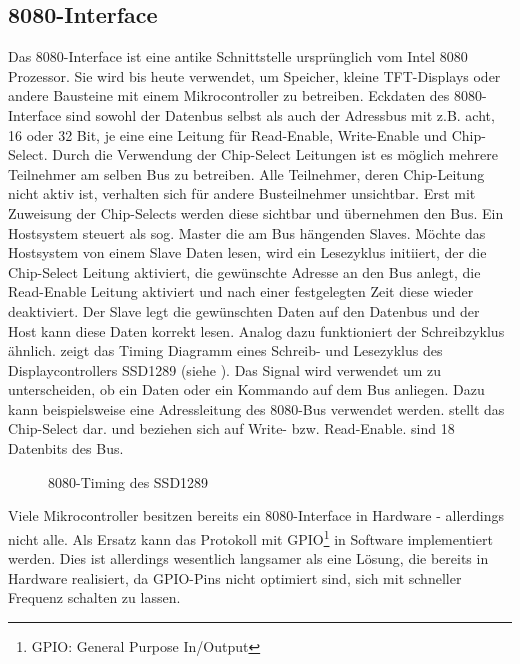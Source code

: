 \subsection{8080-Interface}
Das 8080-Interface ist eine antike Schnittstelle ursprünglich vom Intel 8080 Prozessor. Sie wird bis heute verwendet, um Speicher, kleine TFT-Displays oder andere Bausteine mit einem Mikrocontroller zu betreiben. Eckdaten des 8080-Interface sind sowohl der Datenbus selbst als auch der Adressbus mit z.B. acht, 16 oder 32 Bit, je eine eine Leitung für Read-Enable, Write-Enable und Chip-Select. Durch die Verwendung der Chip-Select Leitungen ist es möglich mehrere Teilnehmer am selben Bus zu betreiben. Alle Teilnehmer, deren Chip-Leitung nicht aktiv ist, verhalten sich für andere Busteilnehmer unsichtbar. Erst mit Zuweisung der Chip-Selects werden diese sichtbar und übernehmen den Bus. Ein Hostsystem steuert als sog. Master die am Bus hängenden Slaves. Möchte das Hostsystem von einem Slave Daten lesen, wird ein Lesezyklus initiiert, der die Chip-Select Leitung aktiviert, die gewünschte Adresse an den Bus anlegt, die Read-Enable Leitung aktiviert und nach einer festgelegten Zeit diese wieder deaktiviert. Der Slave legt die gewünschten Daten auf den Datenbus und der Host kann diese Daten korrekt lesen. Analog dazu funktioniert der Schreibzyklus ähnlich. 
 zeigt das Timing Diagramm eines Schreib- und Lesezyklus des Displaycontrollers SSD1289 (siehe \cite{SSD2007}). Das Signal  wird verwendet um zu unterscheiden, ob ein Daten oder ein Kommando auf dem Bus anliegen. Dazu kann beispielsweise eine Adressleitung des 8080-Bus verwendet werden.  stellt das Chip-Select dar.  und  beziehen sich auf Write- bzw. Read-Enable.  sind 18 Datenbits des Bus. 

\begin{figure}[htp]
	\centering
{}
	\caption{8080-Timing des SSD1289}
	\label{fig:8080_timing}
\end{figure}


Viele Mikrocontroller besitzen bereits ein 8080-Interface in Hardware - allerdings nicht alle. Als Ersatz kann das Protokoll mit GPIO\footnote{GPIO: General Purpose In/Output} in Software implementiert werden. Dies ist allerdings wesentlich langsamer als eine Lösung, die bereits in Hardware realisiert, da GPIO-Pins nicht optimiert sind, sich mit schneller Frequenz schalten zu lassen.
\clearpage

